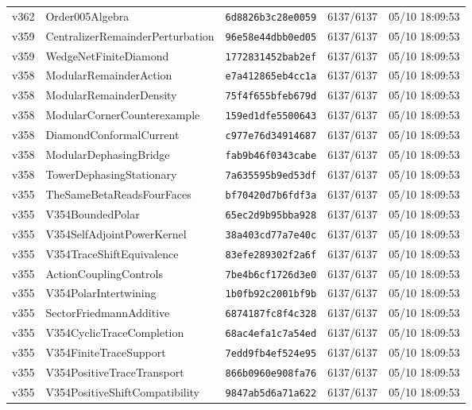 \documentclass[11pt]{article}
\theoremstyle{definition}\newtheorem{deriv}{Derivation}
\begin{document}
{\begin{longtable}{@{}lllll@{}}
v362 & Order005Algebra & \texttt{6d8826b3c28e0059} & 6137/6137 & 05/10 18:09:53 \\
v359 & CentralizerRemainderPerturbation & \texttt{96e58e44dbb0ed05} & 6137/6137 & 05/10 18:09:53 \\
v359 & WedgeNetFiniteDiamond & \texttt{1772831452bab2ef} & 6137/6137 & 05/10 18:09:53 \\
v358 & ModularRemainderAction & \texttt{e7a412865eb4cc1a} & 6137/6137 & 05/10 18:09:53 \\
v358 & ModularRemainderDensity & \texttt{75f4f655bfeb679d} & 6137/6137 & 05/10 18:09:53 \\
v358 & ModularCornerCounterexample & \texttt{159ed1dfe5500643} & 6137/6137 & 05/10 18:09:53 \\
v358 & DiamondConformalCurrent & \texttt{c977e76d34914687} & 6137/6137 & 05/10 18:09:53 \\
v358 & ModularDephasingBridge & \texttt{fab9b46f0343cabe} & 6137/6137 & 05/10 18:09:53 \\
v358 & TowerDephasingStationary & \texttt{7a635595b9ed53df} & 6137/6137 & 05/10 18:09:53 \\
v355 & TheSameBetaReadsFourFaces & \texttt{bf70420d7b6fdf3a} & 6137/6137 & 05/10 18:09:53 \\
v355 & V354BoundedPolar & \texttt{65ec2d9b95bba928} & 6137/6137 & 05/10 18:09:53 \\
v355 & V354SelfAdjointPowerKernel & \texttt{38a403cd77a7e40c} & 6137/6137 & 05/10 18:09:53 \\
v355 & V354TraceShiftEquivalence & \texttt{83efe289302f2a6f} & 6137/6137 & 05/10 18:09:53 \\
v355 & ActionCouplingControls & \texttt{7be4b6cf1726d3e0} & 6137/6137 & 05/10 18:09:53 \\
v355 & V354PolarIntertwining & \texttt{1b0fb92c2001bf9b} & 6137/6137 & 05/10 18:09:53 \\
v355 & SectorFriedmannAdditive & \texttt{6874187fc8f4c328} & 6137/6137 & 05/10 18:09:53 \\
v355 & V354CyclicTraceCompletion & \texttt{68ac4efa1c7a54ed} & 6137/6137 & 05/10 18:09:53 \\
v355 & V354FiniteTraceSupport & \texttt{7edd9fb4ef524e95} & 6137/6137 & 05/10 18:09:53 \\
v355 & V354PositiveTraceTransport & \texttt{866b0960e908fa76} & 6137/6137 & 05/10 18:09:53 \\
v355 & V354PositiveShiftCompatibility & \texttt{9847ab5d6a71a622} & 6137/6137 & 05/10 18:09:53 \\

\end{longtable}}
\end{document}
